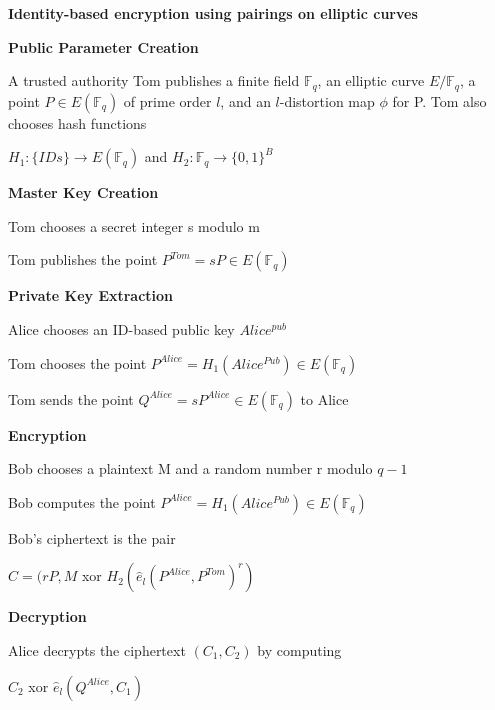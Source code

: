 \documentclass[titlepage]{article}
\begin{document}
\begin{center} 
\textbf{Identity-based encryption using pairings on elliptic curves}

\textbf{Public Parameter Creation}

A trusted authority Tom publishes a finite field $\mathbb{F}_q$, an elliptic curve $E/\mathbb{F}_q$, a point $P \in E(\mathbb{F}_q)$ of prime order $l$, and an $l$-distortion map $\phi$ for P. Tom also chooses hash functions 

$H_1: \{IDs\} \longrightarrow E(\mathbb{F}_q)$ and $H_2: \mathbb{F}_q \longrightarrow \{0,1\}^B$


\textbf{Master Key Creation}

Tom chooses a secret integer s modulo m

Tom publishes the point $P^{Tom} = sP \in E(\mathbb{F}_q)$

\textbf{Private Key Extraction} 

Alice chooses an ID-based public key $Alice^{pub}$

Tom chooses the point $P^{Alice} = H_1(Alice^{Pub}) \in E(\mathbb{F}_q)$

Tom sends the point $Q^{Alice} = sP^{Alice} \in E(\mathbb{F}_q)$ to Alice

\textbf{Encryption}

Bob chooses a plaintext M and a random number r modulo $q-1$

Bob computes the point $P^{Alice} = H_1(Alice^{Pub}) \in E(\mathbb{F}_q)$

Bob's ciphertext is the pair 

$C = (rP, M $ xor $H_2(\hat{e}_l (P^{Alice}, P^{Tom})^r)$
 
 
 \textbf{Decryption}

Alice decrypts the ciphertext $(C_1,C_2)$ by computing

$C_2$ xor $\hat{e}_l(Q^{Alice}, C_1)$
\end{center} 
\end{document}
